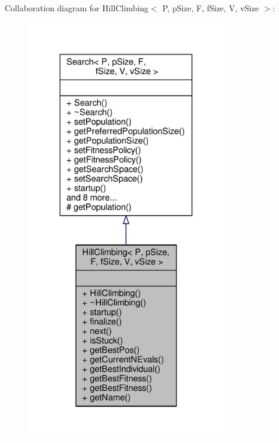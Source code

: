 Collaboration diagram for Hill\+Climbing$<$ P, p\+Size, F, f\+Size, V, v\+Size $>$\+:\nopagebreak
\begin{figure}[H]
\begin{center}
\leavevmode
\includegraphics[width=247pt]{classHillClimbing__coll__graph}
\end{center}
\end{figure}
